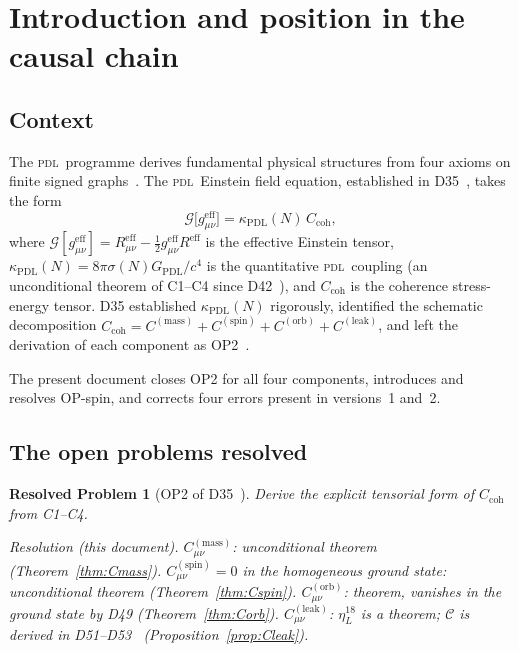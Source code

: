 \documentclass[12pt,a4paper]{article}
\newtheorem{resolvedproblem}{Resolved Problem}
\newcommand{\PDL}{\textsc{pdl}}
\newcommand{\Ccoh}{C_{\mathrm{coh}}}
\newcommand{\Cmass}{C^{(\mathrm{mass})}}
\newcommand{\Cspin}{C^{(\mathrm{spin})}}
\newcommand{\Corb}{C^{(\mathrm{orb})}}
\newcommand{\Cleak}{C^{(\mathrm{leak})}}
\newcommand{\sig}{\sigma}
\newcommand{\kPDL}{\kappa_{\mathrm{PDL}}}
\newcommand{\GPDL}{G_{\mathrm{PDL}}}
\newcommand{\geff}{g_{\mu\nu}^{\mathrm{eff}}}
\newcommand{\etaL}{\eta_L}
\begin{document}
\clearpage
\tableofcontents
\newpage

\section{Introduction and position in the causal chain}
\label{sec:intro}

\subsection{Context}

The \PDL\ programme derives fundamental physical structures from four axioms on finite signed graphs~\cite{PDL_D01_2026,PDL_D02_2026}. The \PDL\ Einstein field equation, established in D35~\cite{PDL_D35_2026}, takes the form
\begin{equation}
\mathcal{G}\bigl[\geff\bigr] = \kPDL(N)\,\Ccoh,
\label{eq:Einstein_PDL}
\end{equation}
where $\mathcal{G}[\geff] = R_{\mu\nu}^{\mathrm{eff}} - \tfrac{1}{2}\geff R^{\mathrm{eff}}$ is the effective Einstein tensor, $\kPDL(N) = 8\pi\sig(N)\GPDL/c^4$ is the quantitative \PDL\ coupling (an unconditional theorem of C1--C4 since D42~\cite{PDL_D42_2026}), and $\Ccoh$ is the coherence stress-energy tensor. D35 established $\kPDL(N)$ rigorously, identified the schematic decomposition $\Ccoh = \Cmass + \Cspin + \Corb + \Cleak$, and left the derivation of each component as OP2~\cite{PDL_D35_2026}.

The present document closes OP2 for all four components, introduces and resolves OP-spin, and corrects four errors present in versions~1 and~2.

\subsection{The open problems resolved}

\begin{resolvedproblem}[OP2 of D35~{\cite{PDL_D35_2026}}]
\label{rp:OP2}
Derive the explicit tensorial form of $\Ccoh$ from C1--C4.

\emph{Resolution (this document).} $\Cmass_{\mu\nu}$: unconditional theorem (Theorem~\ref{thm:Cmass}). $\Cspin_{\mu\nu} = 0$ in the homogeneous ground state: unconditional theorem (Theorem~\ref{thm:Cspin}). $\Corb_{\mu\nu}$: theorem, vanishes in the ground state by D49 (Theorem~\ref{thm:Corb}). $\Cleak_{\mu\nu}$: $\etaL^{18}$ is a theorem; $\mathcal{C}$ is derived in D51--D53~\cite{PDL_D51_2026,PDL_D52_2026,PDL_D53_2026} (Proposition~\ref{prop:Cleak}).
\end{resolvedproblem}
\end{document}
